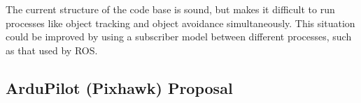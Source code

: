 \documentclass{article}
\begin{document}
  The current structure of the code base is sound, but makes it difficult to run processes like object tracking and object avoidance simultaneously.  This situation could be improved by using a subscriber model between different processes, such as that used by ROS.




  \pagebreak


\renewcommand{\refname}{References}


%


\begin{appendices}




  \section{ArduPilot (Pixhawk) Proposal} \label{sec:PihawkProposal}
    

\end{appendices}

  
\end{document}
